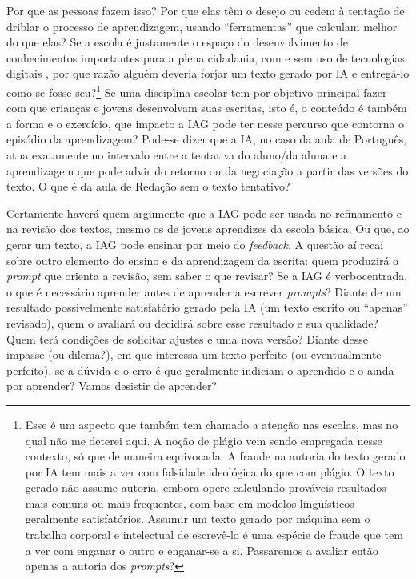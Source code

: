 \documentclass[portuguese]{textolivre}
\begin{document}
Por que as pessoas fazem isso? Por que elas têm o desejo ou cedem à tentação de driblar o processo de aprendizagem, usando ``ferramentas'' que calculam melhor do que elas? Se a escola é justamente o espaço do desenvolvimento de conhecimentos importantes para a plena cidadania, com e sem uso de tecnologias digitais \cite{soares2002}, por que razão alguém deveria forjar um texto gerado por IA e entregá-lo como se fosse seu?\footnote{Esse é um aspecto que também tem chamado a atenção nas escolas, mas no qual não me deterei aqui. A noção de plágio vem sendo empregada nesse contexto, só que de maneira equivocada. A fraude na autoria do texto gerado por IA tem mais a ver com falsidade ideológica do que com plágio. O texto gerado não assume autoria, embora opere calculando prováveis resultados mais comuns ou mais frequentes, com base em modelos linguísticos geralmente satisfatórios. Assumir um texto gerado por máquina sem o trabalho corporal e intelectual de escrevê-lo é uma espécie de fraude que tem a ver com enganar o outro e enganar-se a si. Passaremos a avaliar então apenas a autoria dos \textit{prompts}?} Se uma disciplina escolar tem por objetivo principal fazer com que crianças e jovens desenvolvam suas escritas, isto é, o conteúdo é também a forma e o exercício, que impacto a IAG pode ter nesse percurso que contorna o episódio da aprendizagem? Pode-se dizer que a IA, no caso da aula de Português, atua exatamente no intervalo entre a tentativa do aluno/da aluna e a aprendizagem que pode advir do retorno ou da negociação a partir das versões do texto. O que é da aula de Redação sem o texto tentativo?

Certamente haverá quem argumente que a IAG pode ser usada no refinamento e na revisão dos textos, mesmo os de jovens aprendizes da escola básica. Ou que, ao gerar um texto, a IAG pode ensinar por meio do \textit{feedback}. A questão aí recai sobre outro elemento do ensino e da aprendizagem da escrita: quem produzirá o \textit{prompt} que orienta a revisão, sem saber o que revisar? Se a IAG é verbocentrada, o que é necessário aprender antes de aprender a escrever \textit{prompts}? Diante de um resultado possivelmente satisfatório gerado pela IA (um texto escrito ou ``apenas'' revisado), quem o avaliará ou decidirá sobre esse resultado e sua qualidade? Quem terá condições de solicitar ajustes e uma nova versão? Diante desse impasse (ou dilema?), em que interessa um texto perfeito (ou eventualmente perfeito), se a dúvida e o erro é que geralmente indiciam o aprendido e o ainda por aprender? Vamos desistir de aprender?
\end{document}
